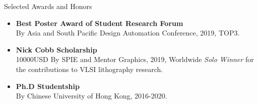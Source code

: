 
\begin{rSection}{Selected Awards and Honors}
\iffalse
\begin{tabbing}
\hspace{3.3in}\= \hspace{2.1in}\= \kill
	Best Poster Award of SRF (JPY20000 TOP#3)  \>ASPDAC \>2019 \\
	Nick Cobb Scholarship (USD10,000 Solo Winner)       \>SPIE \& Mentor Graphics   \>2019 \\
    Ph.D Studentship       \>Chinese Univ. of Hong Kong   \>2016-2020  \\
    Merit Student                             \> Qiushi Honors Collage                      \> 2012 \\
    Excellent praise in Mathematical Modeling Contest                            \> Tianjin Univ.                     \> 2012 \\
    The 3rd praise in National Integrated Circuit Design                 \>Beijing Electronic Committee                        \> 2014 \\
    Excellent Graduate                  \> Tianjin Univ.                   \> 2015 \\
    Excellent dissertation                 \> Tianjin Univ.                   \> 2015 \\
 \end{tabbing}
\fi
\begin{itemize}
	\item \textbf{Best Poster Award of Student Research Forum}\\
	By Asia and South Pacific Design Automation Conference, 2019, TOP3.
	\item \textbf{Nick Cobb Scholarship} \\
	10000USD By SPIE and Mentor Graphics, 2019, Worldwide \textit{Solo Winner} for the contributions to VLSI lithography research.
	\item \textbf{Ph.D Studentship} \\
	By Chinese University of Hong Kong, 2016-2020.
\end{itemize}

\end{rSection}

